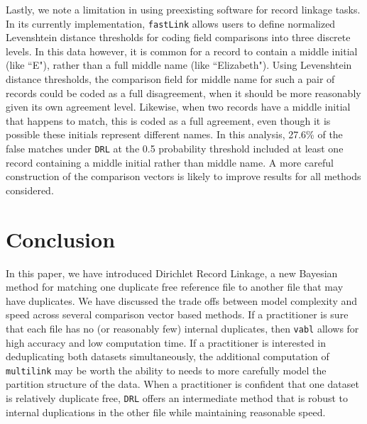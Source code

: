 \documentclass[12pt,letterpaper]{article}
\newcommand{\1}[1]{\mathbb{I}\!\left[#1\right]} %
\begin{document}


Lastly, we note a limitation in using preexisting software for record linkage tasks. In its currently implementation, \texttt{fastLink} allows users to define normalized Levenshtein distance thresholds for coding field comparisons into three discrete levels. In this data however, it is common for a record to contain a middle initial (like ``E"), rather than a full middle name (like ``Elizabeth"). Using Levenshtein distance thresholds, the comparison field for middle name for such a pair of records could be coded as a full disagreement, when it should be more reasonably given its own agreement level. Likewise, when two records have a middle initial that happens to match, this is coded as a full agreement, even though it is possible these initials represent different names. In this analysis, 27.6\% of the false matches under \texttt{DRL} at the 0.5 probability threshold included at least one record containing a middle initial rather than middle name. A more careful construction of the comparison vectors is likely to improve results for all methods considered.

\section{Conclusion}\label{sec:conclusion}

In this paper, we have introduced Dirichlet Record Linkage, a new Bayesian method for matching one duplicate free reference file to another file that may have duplicates. We have discussed the trade offs between model complexity and speed across several comparison vector based methods. If a practitioner is sure that each file has no (or reasonably few) internal duplicates, then \texttt{vabl} allows for high accuracy and low computation time. If a practitioner is interested in deduplicating both datasets simultaneously, the additional computation of \texttt{multilink} may be worth the ability to needs to more carefully model the partition structure of the data. When a practitioner is confident that one dataset is relatively duplicate free, \texttt{DRL} offers an intermediate method that is robust to internal duplications in the other file while maintaining reasonable speed. 
\end{document}
